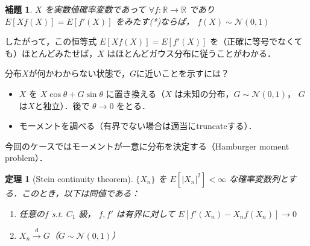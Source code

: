 \documentclass{ltjsarticle}
\theoremstyle{mystyle1}
\newtheorem{thm}[dfn]{定理}
\newtheorem{lem}[dfn]{補題}
\theoremstyle{mystyle2}
\theoremstyle{mystyle3}
\begin{document}
\begin{lem}
    $X$ を実数値確率変数であって $\forall f:\mathbb{R}\to\mathbb{R}$ であり $E[X f(X)]=E[f'(X)]$ をみたす(*)ならば， $f(X)\sim\mathcal{N}(0,1)$
\end{lem}

したがって，この恒等式 $E[Xf(X)]=E[f'(X)]$ を（正確に等号でなくても）ほとんどみたせば，$X$ はほとんどガウス分布に従うことがわかる．

分布$X$が何かわからない状態で，$G$に近いことを示すには？
\begin{itemize}
    \item $X$ を $X\cos\theta+G\sin\theta$ に置き換える（$X$ は未知の分布，$G\sim\mathcal{N}(0,1)$， $G$は$X$と独立）．後で $\theta\to 0$ をとる．
    \item モーメントを調べる（有界でない場合は適当にtruncateする）．
\end{itemize}

今回のケースではモーメントが一意に分布を決定する（Hamburger moment problem）．

\begin{thm}[Stein continuity theorem]
    $\{X_n\}$ を $E[|X_n|^2]<\infty$ な確率変数列とする．このとき，以下は同値である：
    \begin{enumerate}
        \item 任意の$f$ s.t. $C_1$ 級， $f,f'$ は有界に対して $E[f'(X_n)-X_nf(X_n)]\to 0$
        \item $X_n\overset{\mathrm{d}}{\longrightarrow}G$（$G\sim\mathcal{N}(0,1)$）
    \end{enumerate}
\end{thm}
\end{document}
